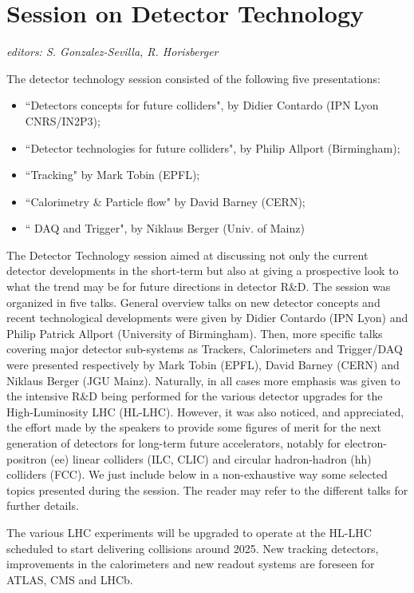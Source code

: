\section{Session on Detector Technology}\label{detectors}{\it editors: S. Gonzalez-Sevilla, R. Horisberger}

\noindent The detector technology session consisted of the following five  presentations:
\begin{itemize} \setlength{\itemsep}{-1ex}
\item ``Detectors concepts for future colliders",  by  Didier Contardo (IPN Lyon CNRS/IN2P3); 
\item ``Detector technologies for future colliders",  by Philip Allport  (Birmingham); 
\item ``Tracking" by Mark Tobin (EPFL);  
\item ``Calorimetry \& Particle flow" by David Barney (CERN); 
\item `` DAQ and Trigger", by Niklaus Berger (Univ. of Mainz) 
\end{itemize}

\noindent The Detector Technology session aimed at discussing not only the current detector developments in the short-term but also at giving a prospective look to what the trend may be for future directions in detector R\&D. The session was organized in five talks. General overview talks on new detector concepts and recent technological developments were given by Didier Contardo (IPN Lyon) and Philip Patrick Allport (University of Birmingham). Then, more specific talks covering major detector sub-systems as Trackers, Calorimeters and Trigger/DAQ were presented respectively by Mark Tobin (EPFL), David Barney (CERN) and Niklaus Berger (JGU Mainz). Naturally, in all cases more emphasis was given to the intensive R\&D being performed for the various detector upgrades for the High-Luminosity LHC (HL-LHC). However, it was also noticed, and appreciated, the effort made by the speakers to provide some figures of merit for the next generation of detectors for long-term future accelerators, notably for electron-positron (ee) linear colliders (ILC, CLIC) and circular hadron-hadron (hh) colliders (FCC). We just include below in a non-exhaustive way some selected topics presented during the session. The reader may refer to the different talks for further details.
\medskip

\noindent The various LHC experiments will be upgraded to operate at the HL-LHC scheduled to start delivering collisions around 2025. New tracking detectors, improvements in the calorimeters and new readout systems are foreseen for ATLAS, CMS and LHCb. 

